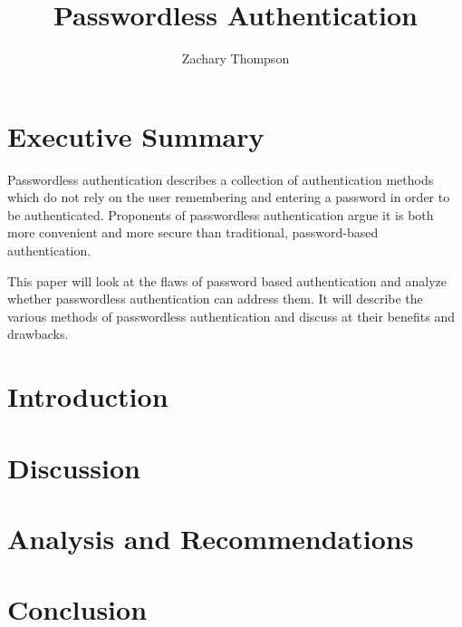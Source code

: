 \documentclass[12pt, letterpaper]{article}
\title{Passwordless Authentication}
\author{Zachary Thompson}
\begin{document}
\maketitle

\section{Executive Summary}
Passwordless authentication describes a collection of authentication methods which do not rely on the user remembering and entering a password in order to be authenticated.
Proponents of passwordless authentication argue it is both more convenient and more secure than traditional, password-based authentication.

This paper will look at the flaws of password based authentication and analyze whether passwordless authentication can address them.
It will describe the various methods of passwordless authentication and discuss at their benefits and drawbacks.
\section{Introduction}
\section{Discussion}
\section{Analysis and Recommendations}
\section{Conclusion}

\printbibliography
\end{document}
